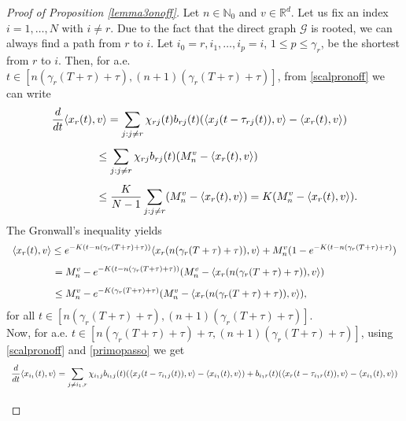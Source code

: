 \documentclass[11pt]{article}
\begin{document}
	\begin{proof}[Proof of Proposition \ref{lemma3onoff}]
		 Let $n\in \mathbb{N}_0$ and $v \in \mathbb{R}^d$. Let us fix an index $i=1,\dots,N$ with $i\neq r$. Due to the fact that the direct graph $\mathcal{G}$ is rooted, we can always find a path from $r$ to $i$. Let $i_0=r,i_1,\dots,i_p=i$, $1\leq p\leq \gamma_r$, be the shortest from $r$ to $i$. Then, for a.e. $t\in [n(\gamma_r(T+\tau)+\tau),(n+1)(\gamma_r(T+\tau)+\tau)]$, from \eqref{scalpronoff} we can write
		$$\begin{array}{l}
			\vspace{0.3cm}\displaystyle{\frac{d}{dt}\langle x_r(t),v\rangle=\sum_{j:j\neq r}\chi_{rj}(t)b_{rj}(t)(\langle x_j(t-\tau_{rj}(t)),v\rangle-\langle x_r(t),v\rangle)}\\
			\vspace{0.3cm}\displaystyle{\hspace{1.5cm}\leq \sum_{j:j\neq r}\chi_{rj}b_{rj}(t)(M_n^v-\langle x_r(t),v\rangle)}\\
			\displaystyle{\hspace{1.5cm}\leq \frac{K}{N-1}\sum_{j:j\neq r}(M_n^v-\langle x_r(t),v\rangle)=K(M_n^v-\langle x_r(t),v\rangle).}
		\end{array}$$
		The Gronwall's inequality yields
		\begin{equation}\label{primopasso}\begin{array}{l}
			\vspace{0.3cm}\displaystyle{\langle x_r(t),v\rangle\leq e^{-K(t-n(\gamma_r(T+\tau)+\tau))}\langle x_r(n(\gamma_r(T+\tau)+\tau)),v\rangle+M_n^v(1-e^{-K(t-n(\gamma_r(T+\tau)+\tau)})}\\
			\vspace{0.3cm}\displaystyle{\hspace{1.5cm}=M_n^v-e^{-K(t-n(\gamma_r(T+\tau)+\tau))}(M_n^v-\langle x_r(n(\gamma_r(T+\tau)+\tau)),v \rangle )}\\
			\displaystyle{\hspace{1.5cm}\leq M_n^v-e^{-K(\gamma_r(T+\tau)+\tau)}(M_n^v-\langle x_r(n(\gamma_r(T+\tau)+\tau)),v \rangle),}
		\end{array}
        \end{equation}
        for all $t\in [n(\gamma_r(T+\tau)+\tau),(n+1)(\gamma_r(T+\tau)+\tau)]$.
		\\Now, for a.e. $t \in [n(\gamma_r(T+\tau)+\tau)+\tau,(n+1)(\gamma_r(T+\tau)+\tau)]$, using \eqref{scalpronoff} and \eqref{primopasso} we get
		$$\begin{array}{l}
			\vspace{0.3cm}\displaystyle{\frac{d}{d t}  \langle x_{i_1}(t),v\rangle =  \sum_{j \neq i_1, r} \chi_{i_1j} b_{i_1j}(t)( \langle x_{j}(t-\tau_{i_1j}(t)),v\rangle-\langle x_{i_1}(t),v\rangle)+ b_{i_1r}(t)(\langle x_{r}(t-\tau_{i_1r}(t)),v\rangle-\langle x_{i_1}(t),v\rangle) }\\

\end{array}$$
\end{proof}
\end{document}
